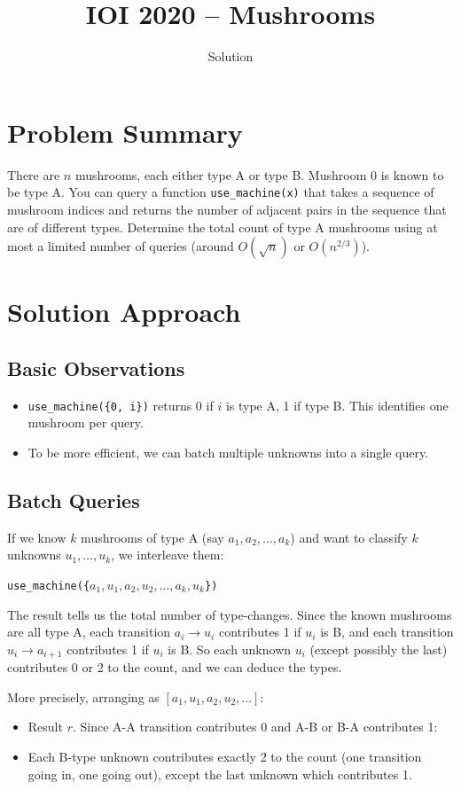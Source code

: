 \documentclass[11pt,a4paper]{article}
\title{IOI 2020 -- Mushrooms}
\author{Solution}
\date{}
\begin{document}
\maketitle

\section{Problem Summary}
There are $n$ mushrooms, each either type A or type B. Mushroom 0 is known to be type A. You can query a function \texttt{use\_machine(x)} that takes a sequence of mushroom indices and returns the number of adjacent pairs in the sequence that are of different types. Determine the total count of type A mushrooms using at most a limited number of queries (around $O(\sqrt{n})$ or $O(n^{2/3})$).

\section{Solution Approach}

\subsection{Basic Observations}
\begin{itemize}
  \item \texttt{use\_machine(\{0, i\})} returns 0 if $i$ is type A, 1 if type B. This identifies one mushroom per query.
  \item To be more efficient, we can batch multiple unknowns into a single query.
\end{itemize}

\subsection{Batch Queries}
If we know $k$ mushrooms of type A (say $a_1, a_2, \ldots, a_k$) and want to classify $k$ unknowns $u_1, \ldots, u_k$, we interleave them:

\texttt{use\_machine(\{$a_1, u_1, a_2, u_2, \ldots, a_k, u_k$\})}

The result tells us the total number of type-changes. Since the known mushrooms are all type A, each transition $a_i \to u_i$ contributes 1 if $u_i$ is B, and each transition $u_i \to a_{i+1}$ contributes 1 if $u_i$ is B. So each unknown $u_i$ (except possibly the last) contributes 0 or 2 to the count, and we can deduce the types.

More precisely, arranging as $[a_1, u_1, a_2, u_2, \ldots]$:
\begin{itemize}
  \item Result $r$. Since A-A transition contributes 0 and A-B or B-A contributes 1:
  \item Each B-type unknown contributes exactly 2 to the count (one transition going in, one going out), except the last unknown which contributes 1.
\end{itemize}
\end{document}
